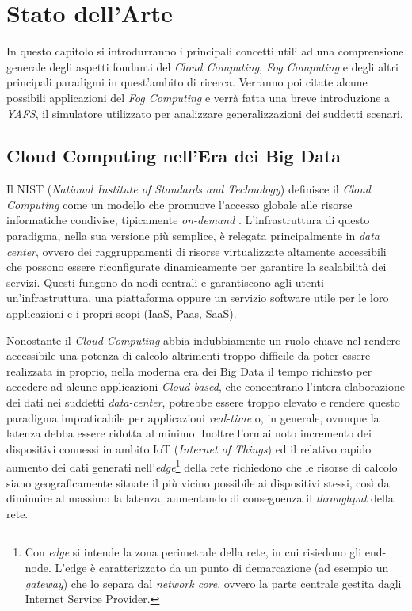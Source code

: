 \chapter{Stato dell'Arte}

In questo capitolo si introdurranno i principali concetti utili ad una comprensione generale degli aspetti fondanti del \textit{Cloud Computing}, \textit{Fog Computing} e degli altri principali paradigmi in quest'ambito di ricerca. Verranno poi citate alcune possibili applicazioni del \textit{Fog Computing} e verrà fatta una breve introduzione a \textit{YAFS}, il simulatore utilizzato per analizzare generalizzazioni dei suddetti scenari.

\section{Cloud Computing nell'Era dei Big Data}

Il NIST (\textit{National Institute of Standards and Technology}) definisce il \textit{Cloud Computing} come un modello che promuove l'accesso globale alle risorse informatiche condivise, tipicamente \textit{on-demand} \cite{NISTCloudComputing}. L'infrastruttura di questo paradigma, nella sua versione più semplice, è relegata principalmente in \textit{data center}, ovvero dei raggruppamenti di risorse virtualizzate altamente accessibili che possono essere riconfigurate dinamicamente per garantire la scalabilità dei servizi. Questi fungono da nodi centrali e garantiscono agli utenti un'infrastruttura, una piattaforma oppure un servizio software utile per le loro applicazioni e i propri scopi (IaaS, Paas, SaaS).

Nonostante il \textit{Cloud Computing} abbia indubbiamente un ruolo chiave nel rendere accessibile una potenza di calcolo altrimenti troppo difficile da poter essere realizzata in proprio, nella moderna era dei Big Data il tempo richiesto per accedere ad alcune applicazioni \textit{Cloud-based}, che concentrano l'intera elaborazione dei dati nei suddetti \textit{data-center}, potrebbe essere troppo elevato e rendere questo paradigma impraticabile per applicazioni \textit{real-time} o, in generale, ovunque la latenza debba essere ridotta al minimo. Inoltre l'ormai noto incremento dei dispositivi connessi in ambito IoT (\textit{Internet of Things}) ed il relativo rapido aumento dei dati generati nell'\textit{edge}\footnote{Con \textit{edge} si intende la zona perimetrale della rete, in cui risiedono gli end-node. L'edge è caratterizzato da un punto di demarcazione (ad esempio un \textit{gateway}) che lo separa dal \textit{network core}, ovvero la parte centrale gestita dagli Internet Service Provider.} della rete richiedono che le risorse di calcolo siano geograficamente situate il più vicino possibile ai dispositivi stessi, così da diminuire al massimo la latenza, aumentando di conseguenza il \textit{throughput} della rete.

